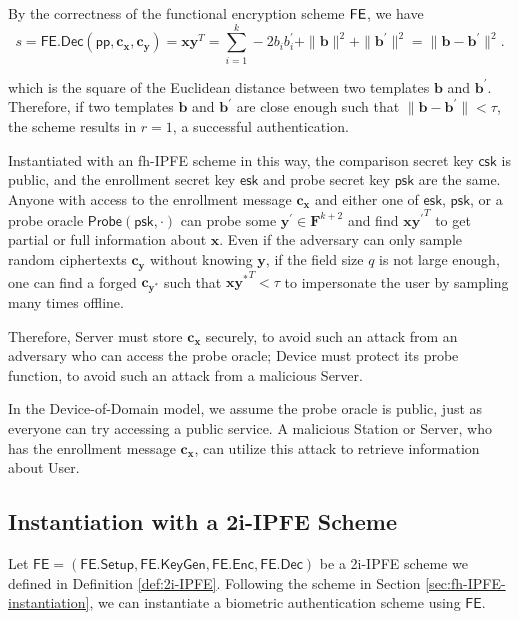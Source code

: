 By the correctness of the functional encryption scheme $\sf FE$, we have
\[
	s = \textsf{FE.Dec}(\textsf{pp}, \mathbf{c_x}, \mathbf{c_y}) =  \mathbf{x} \mathbf{y}^T = \sum_{i=1}^k -2b_ib_i^\prime + \|\mathbf{b}\|^2 + \|\mathbf{b}^\prime\|^2 = \| \mathbf{b} - \mathbf{b}^\prime \|^2.
\]

which is the square of the Euclidean distance between two templates $\mathbf{b}$ and $\mathbf{b}^\prime$. Therefore, if two templates $\mathbf{b}$ and $\mathbf{b}^\prime$ are close enough such that $\|\mathbf{b} - \mathbf{b}^\prime\| < \tau$, the scheme results in $r = 1$, a successful authentication.


Instantiated with an fh-IPFE scheme in this way, the comparison secret key $\textsf{csk}$ is public, and the enrollment secret key $\textsf{esk}$ and probe secret key $\textsf{psk}$ are the same. Anyone with access to the enrollment message $\mathbf{c_x}$ and either one of $\textsf{esk}$, $\textsf{psk}$, or a probe oracle $\textsf{Probe}(\textsf{psk}, \cdot )$ can probe some $\mathbf{y}^{\prime} \in \mathbf{F}^{k+2}$ and find $\mathbf{x} {\mathbf{y}^\prime}^T$ to get partial or full information about $\mathbf{x}$. Even if the adversary can only sample random ciphertexts $\mathbf{c_{y}}$ without knowing $\mathbf{y}$, if the field size $q$ is not large enough, one can find a forged $\mathbf{c_{y^*}}$ such that $\mathbf{x}\mathbf{y^*}^T < \tau$ to impersonate the user by sampling many times offline.

Therefore, \textsf{Server} must store $\mathbf{c_x}$ securely, to avoid such an attack from an adversary who can access the probe oracle; \textsf{Device} must protect its probe function, to avoid such an attack from a malicious \textsf{Server}. 

In the Device-of-Domain model, we assume the probe oracle is public, just as everyone can try accessing a public service. A malicious \textsf{Station} or \textsf{Server}, who has the enrollment message $\mathbf{c_x}$, can utilize this attack to retrieve information about \textsf{User}.




\subsection{Instantiation with a 2i-IPFE Scheme}
\label{sec:2i-IPFE-instantiation}

Let $\textsf{FE} = (\textsf{FE.Setup}, \textsf{FE.KeyGen}, \textsf{FE.Enc}, \textsf{FE.Dec})$ be a 2i-IPFE scheme we defined in Definition \ref{def:2i-IPFE}. Following the scheme in Section \ref{sec:fh-IPFE-instantiation}, we can instantiate a biometric authentication scheme using $\textsf{FE}$.

